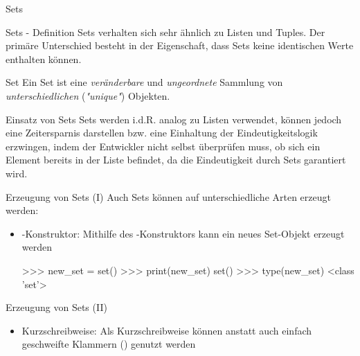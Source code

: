     \begin{subsection}{Sets}
    
        \begin{frame}{Sets - Definition}
            Sets verhalten sich sehr ähnlich zu Listen und Tuples. Der primäre Unterschied besteht in der Eigenschaft, dass Sets keine identischen Werte enthalten können.
            
            \begin{block}{Set}
                Ein Set ist eine \textit{veränderbare} und \textit{ungeordnete} Sammlung von \textit{unterschiedlichen} (\textit{"unique"}) Objekten.
            \end{block}
        \end{frame}
        
        \begin{frame}{Einsatz von Sets}
            Sets werden i.d.R. analog zu Listen verwendet, können jedoch eine Zeitersparnis darstellen bzw. eine Einhaltung der Eindeutigkeitslogik erzwingen, indem der Entwickler nicht selbst überprüfen muss, ob sich ein Element bereits in der Liste befindet, da die Eindeutigkeit durch Sets garantiert wird.
            
        \end{frame}
        
        \begin{frame}[fragile]{Erzeugung von Sets (I)}
            Auch Sets können auf unterschiedliche Arten erzeugt werden:
            
            \begin{itemize}
                \item {}-Konstruktor: Mithilfe des -Konstruktors kann ein neues Set-Objekt erzeugt werden
                
\begin{pyconcode}
>>> new_set = set()
>>> print(new_set)
set()
>>> type(new_set)
<class 'set'>
\end{pyconcode} 

            \end{itemize}
            
        \end{frame}
        
        
        \begin{frame}[fragile]{Erzeugung von Sets (II)}
     
            \begin{itemize}
                \item Kurzschreibweise: Als Kurzschreibweise können anstatt  auch einfach geschweifte Klammern (\code{\{ \}}) genutzt werden
                

\end{itemize}
\end{frame}
\end{subsection}

